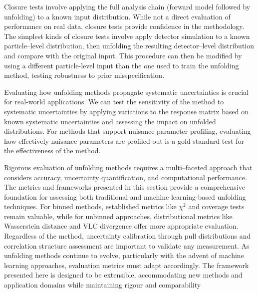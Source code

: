         Closure tests involve applying the full analysis chain (forward model followed by unfolding) to a known input distribution.
        While not a direct evaluation of performance on real data, closure tests provide confidence in the methodology.
        The simplest kinds of closure tests involve apply detector simulation to a known particle--level distribution, then unfolding the resulting detector--level distribution and compare with the original input.
        This procedure can then be modified by using a different particle-level input than the one used to train the unfolding method, testing robustness to prior misspecification.
        
        Evaluating how unfolding methods propagate systematic uncertainties is crucial for real-world applications.
        We can test the sensitivity of the method to systematic uncertainties by applying variations to the response matrix based on known systematic uncertainties and assessing the impact on unfolded distributions.
        For methods that support nuisance parameter profiling, evaluating how effectively nuisance parameters are profiled out is a gold standard test for the effectiveness of the method.
        
        Rigorous evaluation of unfolding methods requires a multi--faceted approach that considers accuracy, uncertainty quantification, and computational performance.
        The metrics and frameworks presented in this section provide a comprehensive foundation for assessing both traditional and machine learning-based unfolding techniques.
        For binned methods, established metrics like \(\chi^2\) and coverage tests remain valuable, while for unbinned approaches, distributional metrics like Wasserstein distance and VLC divergence offer more appropriate evaluation.
        Regardless of the method, uncertainty calibration through pull distributions and correlation structure assessment are important to validate any measurement.
        As unfolding methods continue to evolve, particularly with the advent of machine learning approaches, evaluation metrics must adapt accordingly.
        The framework presented here is designed to be extensible, accommodating new methods and application domains while maintaining rigour and comparability